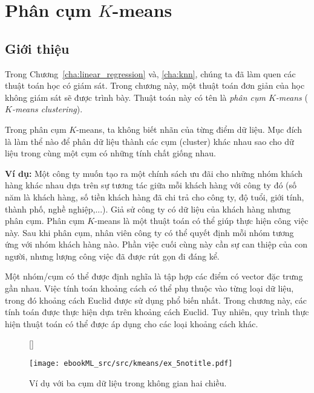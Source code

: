\chapter{Phân cụm $K$-means}
\label{cha:kmeans}
\section{Giới thiệu}
Trong Chương~\ref{cha:linear_regression} và, \ref{cha:knn}, chúng ta đã làm quen
các thuật toán học có giám sát. Trong chương này, một thuật toán đơn giản của
học không giám sát sẽ được trình bày. Thuật toán này có tên là \textit{phân cụm
$K$-means} (\textit{$K$-means clustering}).

Trong phân cụm $K$-means, ta không biết nhãn của từng
điểm dữ liệu. Mục đích là làm thể nào để phân dữ liệu thành các cụm (cluster)
khác nhau sao cho dữ liệu trong cùng một cụm có những tính chất giống nhau.

\textbf{Ví dụ:} Một công ty muốn tạo ra một chính sách ưu đãi cho những nhóm
khách hàng khác nhau dựa trên sự tương tác giữa mỗi khách hàng với công ty đó
(số năm là khách hàng, số tiền khách hàng đã chi trả cho công ty, độ tuổi, giới
tính, thành phố, nghề nghiệp,...). Giả sử công ty có dữ liệu của khách hàng
nhưng phân cụm. Phân cụm $K$-means là một thuật toán có thể giúp thực hiện
công việc này. Sau khi phân cụm, nhân viên công ty có thể quyết định mỗi
nhóm tương ứng với nhóm khách hàng nào. Phần việc cuối cùng này cần sự can thiệp
của con người, nhưng lượng công việc đã được rút gọn đi đáng kể.


Một nhóm/cụm có thể được định nghĩa là tập hợp các điểm có
vector đặc trưng gần nhau. Việc tính toán khoảng cách có thể phụ thuộc vào từng loại dữ liệu, trong đó khoảng cách Euclid được sử dụng phổ biến nhất. Trong chương này, các tính toán được thực hiện dựa trên khoảng cách Euclid. Tuy nhiên, quy trình thực hiện thuật toán có thể được áp dụng cho các loại khoảng cách khác.

\begin{figure}[t]
[\FBwidth]
{\caption{
Ví dụ với ba cụm dữ liệu trong không gian hai chiều.
}
\label{fig:4_1}}
{ %
\texttt{[image: ebookML\_src/src/kmeans/ex\_5notitle.pdf]}
}
\end{figure}

